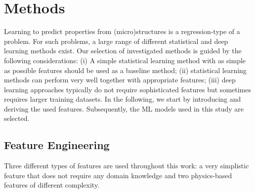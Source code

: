 \documentclass[11pt, authoryear]{elsarticle}
\begin{document}
	\section{Methods} \label{sec:solutions}
	Learning to predict properties from (micro)structures is a regression-type of 
	a problem. For such problems, a large range of different statistical and deep
	learning methods exist. Our selection of  investigated methods is guided by
	the following considerations: (i) A simple statistical learning method with 
	as simple as possible features should be used as a baseline method; (ii)
	statistical learning methods can perform very well together with appropriate
	features; (iii) deep learning approaches typically do not require sophisticated
	features but sometimes requires larger training datasets.
	In the following, we start by introducing and deriving the used features.
	Subsequently, the \gls{ML} models used in this study are selected.
	
	\subsection{Feature Engineering}
	Three different types of features are used throughout this work: a very 
	simplistic feature that does not require any domain knowledge and two
	physics-based features of different complexity.
	
\end{document}
